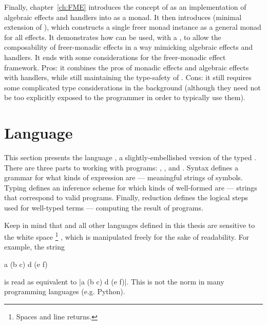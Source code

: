 Finally, chapter~\ref{ch:FME} introduces the concept of  as an implementation of algebraic effects and handlers into \LangC as a monad.
It then introduces \LangE (minimal extension of \LangC), which constructs a single freer monad instance as a general monad for all effects.
It demonstrates how \LangE can be used, with a , to allow the composability of freer-monadic effects in a way mimicking algebraic effects and handlers.
It ends with some considerations for the freer-monadic effect framework.
Pros: it combines the pros of monadic effects and algebraic effects with handlers, while still maintaining the type-safety of \LangA.
Cons: it still requires some complicated type considerations in the background (although they need not be too explicitly exposed to the programmer in order to typically use them).

\newpage
\section{Language \LangA}
\label{sec:LangA}

This section presents the language \LangA, a slightly-embellished version of the typed \lc.
There are three parts to working with \LangA programs: , , and .
Syntax defines a grammar for what kinds of expression are  --- meaningful strings of symbols.
Typing defines an inference scheme for which kinds of well-formed are  --- strings that correspond to valid programs.
Finally, reduction defines the logical steps used for  well-typed terms --- computing the result of programs.

Keep in mind that \LangA and all other languages defined in this thesis are  sensitive to the white space%
\footnote{
  Spaces and line returns.
}%
, which is manipulated freely for the sake of readability.
For example, the string
\begin{snippet}
a (b c)
  d
  (e
    f)
\end{snippet}
is read as equivalent to \code|a (b c) d (e f)|.
This is not the norm in many programming languages (e.g. Python).

\newpage

